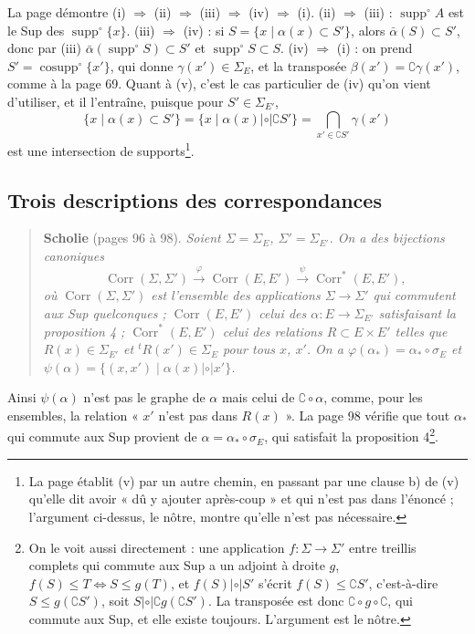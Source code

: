 \documentclass[11pt,a4paper]{article}
\begin{document}
La page démontre (i) $\Rightarrow$ (ii) $\Rightarrow$ (iii) $\Rightarrow$ (iv)
$\Rightarrow$ (i). (ii) $\Rightarrow$ (iii) : $\operatorname{supp}^{\circ}A$ est
le Sup des $\operatorname{supp}^{\circ}\{x\}$. (iii) $\Rightarrow$ (iv) : si $S
= \{x \mid \alpha(x) \subset S'\}$, alors $\bar\alpha(S) \subset S'$, donc par
(iii) $\bar\alpha(\operatorname{supp}^{\circ}S) \subset S'$ et
$\operatorname{supp}^{\circ}S \subset S$. (iv) $\Rightarrow$ (i) : on prend $S' =
\operatorname{cosupp}^{\circ}\{x'\}$, qui donne $\gamma(x') \in \Sigma_{E}$, et la
transposée $\beta(x') = \complement\gamma(x')$, comme à la page 69. Quant à (v),
c'est le cas particulier de (iv) qu'on vient d'utiliser, et il l'entraîne,
puisque pour $S' \in \Sigma_{E'}$,
\[
\{x \mid \alpha(x) \subset S'\} = \{x \mid \alpha(x) \mathrel{|\circ|}
\complement S'\} = \bigcap_{x' \in \complement S'} \gamma(x')
\]
est une intersection de supports\footnote{La page établit (v) par un autre
chemin, en passant par une clause b) de (v) qu'elle dit avoir « dû y ajouter après-coup » et qui n'est pas dans l'énoncé ; l'argument ci-dessus, le nôtre, montre
qu'elle n'est pas nécessaire.}.

\subsection*{Trois descriptions des correspondances}

\begin{quote}
\textbf{Scholie} (pages 96 à 98). \emph{Soient $\Sigma = \Sigma_{E}$, $\Sigma' =
\Sigma_{E'}$. On a des bijections canoniques}
\[
\operatorname{Corr}(\Sigma, \Sigma') \xrightarrow{\ \varphi\ }
\operatorname{Corr}(E, E') \xrightarrow{\ \psi\ } \operatorname{Corr}^{*}(E, E'),
\]
\emph{où $\operatorname{Corr}(\Sigma, \Sigma')$ est l'ensemble des applications
$\Sigma \to \Sigma'$ qui commutent aux Sup quelconques ;
$\operatorname{Corr}(E, E')$ celui des $\alpha : E \to \Sigma_{E'}$ satisfaisant
la proposition 4 ; $\operatorname{Corr}^{*}(E, E')$ celui des relations $R \subset
E \times E'$ telles que $R(x) \in \Sigma_{E'}$ et ${}^{t}R(x') \in \Sigma_{E}$
pour tous $x$, $x'$. On a $\varphi(\alpha_{*}) = \alpha_{*} \circ \sigma_{E}$ et
$\psi(\alpha) = \{(x, x') \mid \alpha(x) \mathrel{|\circ|} x'\}$.}
\end{quote}

Ainsi $\psi(\alpha)$ n'est pas le graphe de $\alpha$ mais celui de $\complement
\circ \alpha$, comme, pour les ensembles, la relation « $x'$ n'est pas dans
$R(x)$ ». La page 98 vérifie que tout $\alpha_{*}$ qui commute aux Sup provient
de $\alpha = \alpha_{*} \circ \sigma_{E}$, qui satisfait la proposition
4\footnote{On le voit aussi directement : une application $f : \Sigma \to
\Sigma'$ entre treillis complets qui commute aux Sup a un adjoint à droite $g$,
$f(S) \leq T \iff S \leq g(T)$, et $f(S) \mathrel{|\circ|} S'$ s'écrit $f(S) \leq
\complement S'$, c'est-à-dire $S \leq g(\complement S')$, soit $S
\mathrel{|\circ|} \complement g(\complement S')$. La transposée est donc
$\complement \circ g \circ \complement$, qui commute aux Sup, et elle existe
toujours. L'argument est le nôtre.}.
\end{document}
